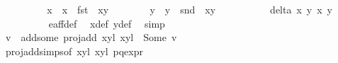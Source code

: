 \begin{isabellebody}
\ {}\isanewline
\ \ \ \ \ \ \isamarkupfalse%
\ x{\isacharprime}{\isacharprime}\ \ {\isachardoublequoteopen}x{\isacharprime}{\isacharprime}\ {\isacharequal}\ fst\ {\isacharparenleft}{\isasymtau}\ {\isacharparenleft}x{\isacharprime}{\isacharcomma}y{\isacharprime}{\isacharparenright}{\isacharparenright}{\isachardoublequoteclose}\isanewline
\ \ \ \ \ \ \isamarkupfalse%
\ y{\isacharprime}{\isacharprime}\ \ {\isachardoublequoteopen}y{\isacharprime}{\isacharprime}\ {\isacharequal}\ snd\ {\isacharparenleft}{\isasymtau}\ {\isacharparenleft}x{\isacharprime}{\isacharcomma}y{\isacharprime}{\isacharparenright}{\isacharparenright}{\isachardoublequoteclose}\isanewline
\ \ \ \ \ \ \isamarkupfalse%
\ {}\ \isamarkupfalse%
\ {\isachardoublequoteopen}delta\ x\ y\ x{\isacharprime}{\isacharprime}\ y{\isacharprime}{\isacharprime}\ {\isasymnoteq}\ {}{\isachardoublequoteclose}\isanewline
\ \ \ \ \ \ \ \ \isamarkupfalse%
\ e{\isacharunderscore}aff{\isacharunderscore}{}{\isacharunderscore}def\ \isamarkupfalse%
\ x{\isacharprime}{\isacharprime}{\isacharunderscore}def\ y{\isacharprime}{\isacharprime}{\isacharunderscore}def\ \isamarkupfalse%
\ simp\ \isanewline
\ \ \ \ \ \ \isamarkupfalse%
\ \isamarkupfalse%
\ v\ \ add{\isacharunderscore}some{\isacharcolon}\ {\isachardoublequoteopen}proj{\isacharunderscore}add\ {\isacharparenleft}{\isacharparenleft}x{\isacharcomma}y{\isacharparenright}{\isacharcomma}l{\isacharparenright}\ {\isacharparenleft}{\isacharparenleft}x{\isacharprime}{\isacharprime}{\isacharcomma}y{\isacharprime}{\isacharprime}{\isacharparenright}{\isacharcomma}l{\isacharprime}{\isacharplus}{}{\isacharparenright}\ {\isacharequal}\ Some\ v{\isachardoublequoteclose}\isanewline
\ \ \ \ \ \ \ \ \isamarkupfalse%
\ proj{\isacharunderscore}add{\isachardot}simps{\isacharbrackleft}of\ {\isachardoublequoteopen}{\isacharparenleft}{\isacharparenleft}x{\isacharcomma}y{\isacharparenright}{\isacharcomma}l{\isacharparenright}{\isachardoublequoteclose}\ {\isachardoublequoteopen}{\isacharparenleft}{\isacharparenleft}x{\isacharprime}{\isacharprime}{\isacharcomma}y{\isacharprime}{\isacharprime}{\isacharparenright}{\isacharcomma}l{\isacharprime}{\isacharplus}{}{\isacharparenright}{\isachardoublequoteclose}{\isacharbrackright}\ p{\isacharunderscore}q{\isacharunderscore}expr\isanewline
\ \ \ \ \ \ \ \ \isamarkupfalse%

\end{isabellebody}
